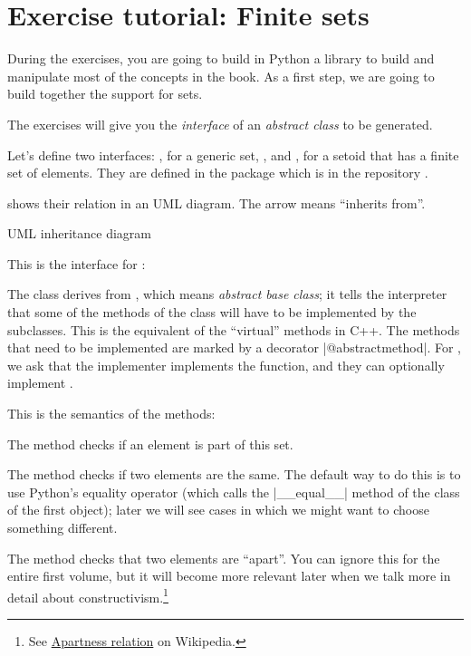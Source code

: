 

\section{Exercise tutorial: Finite sets}\label{sec:exercise-tutorial}


During the exercises, you are going to build in Python a library to build and manipulate most of the concepts in the book.
As a first step, we are going to build together the support for sets.

The exercises will give you the \emph{interface} of an \emph{abstract class} to be generated.

Let's define two interfaces: \Setoid, for a generic set, \EnumerableSet, and \FiniteSet, for a setoid that has a finite set of elements.
They are defined in the package  which is in the repository .

 shows their relation in an UML diagram. The arrow means ``inherits from''.

\begin{marginfigure}

  \caption{UML inheritance diagram}
  \label{fig:Setoid-inheritance}
\end{marginfigure}

This is the interface for \Setoid:

\begin{longcode}
\caption{}
\label{lst:Setoid}
\end{longcode}

The class \Setoid  derives from , which means \emph{abstract base class}; it tells the interpreter that some of the methods of the class will have to be implemented by the subclasses.
This is the equivalent of the ``virtual'' methods in C++.
The methods that need to be implemented are marked by a decorator \pystr|@abstractmethod|.
For \Setoid, we ask that the implementer implements the  function, and they can optionally implement .

This is the semantics of the methods:

\begin{compactitem}
  \item The method  checks if an element is part of this set.
  \item The method  checks if two elements are the same.
  The default way to do this is to use Python's equality operator (which calls the \pystr|__equal__| method of the class of the first object); later we will see cases in which we might want to choose something different.
   \item The method  checks that two elements are ``apart''.
     You can ignore this for the entire first volume, but it will become more relevant later when we talk more in detail about constructivism.\footnote{%
     See \href{https://en.wikipedia.org/wiki/Apartness_relation}{Apartness relation} on Wikipedia.}
\end{compactitem}



